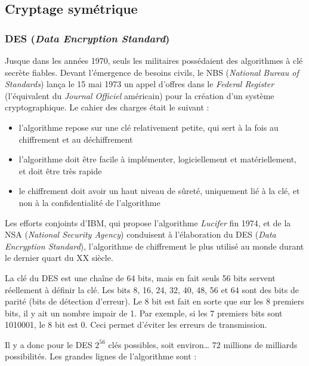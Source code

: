 \documentclass[a4paper,12pt]{article}
\begin{document}
\subsection{Cryptage symétrique}

\subsubsection{DES (\emph{Data Encryption Standard})}

Jusque dans les années 1970, seuls les militaires possédaient des algorithmes à clé secrète fiables. Devant l'émergence de besoins civils, le NBS (\emph{National Bureau of Standards}) lança le 15 mai 1973 un appel d'offres dans le \emph{Federal Register} (l'équivalent du \emph{Journal Officiel} américain) pour la création d'un système cryptographique. Le cahier des charges était le suivant :

\begin{itemize}
\item l'algorithme repose sur une clé relativement petite, qui sert à la fois au chiffrement et au déchiffrement
\item l'algorithme doit être facile à implémenter, logiciellement et matériel\-lement, et doit être très rapide
\item le chiffrement doit avoir un haut niveau de sûreté, uniquement lié à la clé, et non à la confidentialité de l'algorithme
\end{itemize}

Les efforts conjoints d'IBM, qui propose l'algorithme \emph{Lucifer} fin 1974, et de la NSA (\emph{National Security Agency}) conduisent à l'élaboration du DES (\emph{Data Encryption Standard}), l'algorithme de chiffrement le plus utilisé au monde durant le dernier quart du XX\ieme{} siècle.

La clé du DES est une chaîne de 64 bits, mais en fait seuls 56 bits servent réellement à définir la clé. Les bits 8, 16, 24, 32, 40, 48, 56 et 64 sont des bits de parité (bits de détection d'erreur). Le 8\ieme{} bit est fait en sorte que sur les 8 premiers bits, il y ait un nombre impair de 1. Par exemple, si les 7 premiers bits sont 1010001, le 8\ieme{} bit est 0. Ceci permet d'éviter les erreurs de transmission.

Il y a donc pour le DES $2^{56}$ clés possibles, soit environ\dots{} 72 millions de milliards possibilités. Les grandes lignes de l'algorithme sont :
\end{document}
